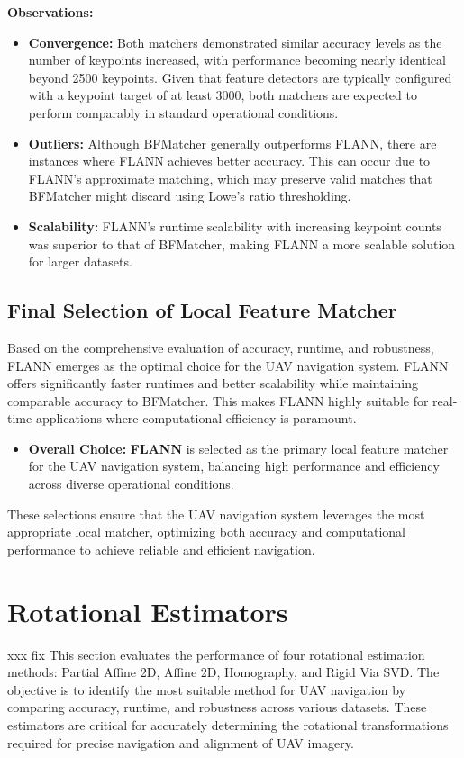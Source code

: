 \begin{itemize}
\textbf{Observations:}
\begin{itemize}
    \item \textbf{Convergence:} Both matchers demonstrated similar accuracy levels as the number of keypoints increased, with performance becoming nearly identical beyond 2500 keypoints. Given that feature detectors are typically configured with a keypoint target of at least 3000, both matchers are expected to perform comparably in standard operational conditions.
    \item \textbf{Outliers:} Although BFMatcher generally outperforms FLANN, there are instances where FLANN achieves better accuracy. This can occur due to FLANN’s approximate matching, which may preserve valid matches that BFMatcher might discard using Lowe’s ratio thresholding.
    \item \textbf{Scalability:} FLANN's runtime scalability with increasing keypoint counts was superior to that of BFMatcher, making FLANN a more scalable solution for larger datasets.
\end{itemize}

\subsection{Final Selection of Local Feature Matcher}

Based on the comprehensive evaluation of accuracy, runtime, and robustness, FLANN emerges as the optimal choice for the UAV navigation system. FLANN offers significantly faster runtimes and better scalability while maintaining comparable accuracy to BFMatcher. This makes FLANN highly suitable for real-time applications where computational efficiency is paramount.

\begin{itemize}
    \item \textbf{Overall Choice:} \textbf{FLANN} is selected as the primary local feature matcher for the UAV navigation system, balancing high performance and efficiency across diverse operational conditions.
\end{itemize}

These selections ensure that the UAV navigation system leverages the most appropriate local matcher, optimizing both accuracy and computational performance to achieve reliable and efficient navigation.


\section{Rotational Estimators}
xxx fix
This section evaluates the performance of four rotational estimation methods: Partial Affine 2D, Affine 2D, Homography, and Rigid Via SVD. The objective is to identify the most suitable method for UAV navigation by comparing accuracy, runtime, and robustness across various datasets. These estimators are critical for accurately determining the rotational transformations required for precise navigation and alignment of UAV imagery.


\end{itemize}
